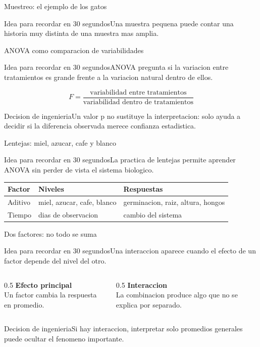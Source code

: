 \documentclass[aspectratio=169,11pt]{beamer}
\newcommand{\idea}[1]{\begin{block}{Idea para recordar en 30 segundos}#1\end{block}}
\newcommand{\decision}[1]{\begin{alertblock}{Decision de ingenieria}#1\end{alertblock}}
\begin{document}
\begin{frame}{Muestreo: el ejemplo de los gatos}
  \idea{Una muestra pequena puede contar una historia muy distinta de una muestra mas amplia.}
  \begin{center}
  \end{center}
\end{frame}

\begin{frame}{ANOVA como comparacion de variabilidades}
  \idea{ANOVA pregunta si la variacion entre tratamientos es grande frente a la variacion natural dentro de ellos.}
  \[
    F=\frac{\text{variabilidad entre tratamientos}}{\text{variabilidad dentro de tratamientos}}
  \]
  \decision{Un valor p no sustituye la interpretacion: solo ayuda a decidir si la diferencia observada merece confianza estadistica.}
\end{frame}

\begin{frame}{Lentejas: miel, azucar, cafe y blanco}
  \idea{La practica de lentejas permite aprender ANOVA sin perder de vista el sistema biologico.}
  \begin{table}
    \centering
    \begin{tabular}{lll}
      \toprule
      Factor & Niveles & Respuestas \\
      \midrule
      Aditivo & miel, azucar, cafe, blanco & germinacion, raiz, altura, hongos \\
      Tiempo & dias de observacion & cambio del sistema \\
      \bottomrule
    \end{tabular}
  \end{table}
\end{frame}

\begin{frame}{Dos factores: no todo se suma}
  \idea{Una interaccion aparece cuando el efecto de un factor depende del nivel del otro.}
  \begin{columns}
    \begin{column}{0.5\textwidth}
      \textbf{Efecto principal}\\
      Un factor cambia la respuesta en promedio.
    \end{column}
    \begin{column}{0.5\textwidth}
      \textbf{Interaccion}\\
      La combinacion produce algo que no se explica por separado.
    \end{column}
  \end{columns}
  \decision{Si hay interaccion, interpretar solo promedios generales puede ocultar el fenomeno importante.}
\end{frame}
\end{document}
